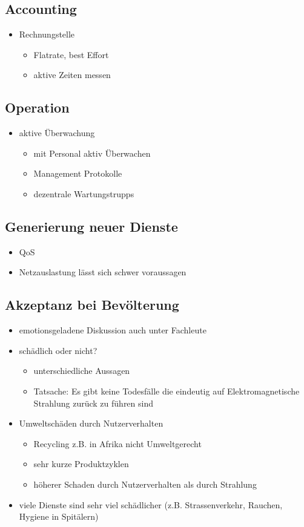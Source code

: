 \subsection{Accounting}
\begin{itemize}
\item Rechnungstelle
\begin{itemize}
\item Flatrate, best Effort
\item aktive Zeiten messen
\end{itemize}
\end{itemize}

\subsection{Operation}
\begin{itemize}
\item aktive Überwachung
\begin{itemize}
\item mit Personal aktiv Überwachen
\item Management Protokolle
\item dezentrale Wartungstrupps
\end{itemize}
\end{itemize}
\subsection{Generierung neuer Dienste}
\begin{itemize}
\item QoS
\item Netzauslastung lässt sich schwer voraussagen
\end{itemize}
\subsection{Akzeptanz bei Bevölterung}
\begin{itemize}
\item emotionsgeladene Diskussion auch unter Fachleute
\item schädlich oder nicht?
\begin{itemize}
\item unterschiedliche Aussagen
\item Tatsache: Es gibt keine Todesfälle die eindeutig auf Elektromagnetische Strahlung zurück zu führen sind
\end{itemize}
\item Umweltschäden durch Nutzerverhalten
\begin{itemize}
\item Recycling z.B. in Afrika nicht Umweltgerecht
\item sehr kurze Produktzyklen
\item höherer Schaden durch Nutzerverhalten als durch Strahlung
\end{itemize}
\item viele Dienste sind sehr viel schädlicher (z.B. Strassenverkehr, Rauchen, Hygiene in Spitälern)
\end{itemize}

